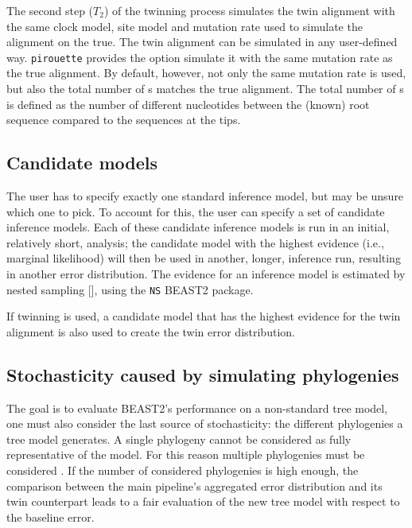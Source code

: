 The second step ($T_2$) of the twinning process simulates the twin alignment 
with the same clock model, site model and mutation rate 
used to simulate the alignment on the true. 
The twin alignment can be simulated in any user-defined way.
\verb;pirouette; provides the option simulate it with the same mutation rate as the true alignment. By default, however,
not only the same mutation rate is used, but also the total number of 
s
matches the true alignment. The total number of s is defined
as the number of different nucleotides between the (known) root sequence
compared to the sequences at the tips.

\subsection{Candidate models}
\label{subsec:candidates}

The user has to specify exactly one standard inference model,
but may be unsure which one to pick. To account for this, the user can
specify a set of candidate inference models. Each of these candidate inference models is run in an initial, relatively short, analysis; the candidate model with the highest 
evidence (i.e., marginal likelihood) will then be
used in another, longer, inference run, resulting in another error distribution.
The evidence for an inference model is estimated by nested 
sampling [\cite{russel2019model}], using the \verb;NS; BEAST2 package. 

If twinning is used, a candidate model that has the highest evidence for
the twin alignment is also used to create the twin error
distribution.

\subsection{Stochasticity caused by simulating phylogenies}
\label{subsec:stochasticity}

The goal is to evaluate BEAST2's performance 
on a non-standard tree model, 
one must also consider the last source of stochasticity: 
the different phylogenies a tree model generates.
A single phylogeny cannot be considered as fully representative of the model. 
For this reason multiple phylogenies must be 
considered .
If the number of considered phylogenies is high enough, 
the comparison between the main pipeline's aggregated error distribution 
and its twin counterpart leads to a fair evaluation 
of the new tree model with respect to the baseline error.

